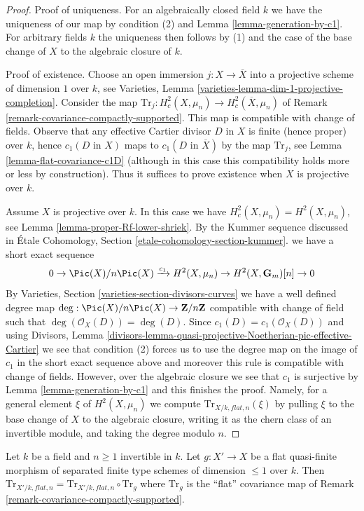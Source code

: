 \begin{proof}
Proof of uniqueness. For an algebraically closed field $k$
we have the uniqueness of our map by condition (2) and
Lemma \ref{lemma-generation-by-c1}. For arbitrary fields $k$
the uniqueness then follows by (1) and the case of the base
change of $X$ to the algebraic closure of $k$.

\medskip\noindent
Proof of existence. Choose an open immersion $j : X \to \overline{X}$
into a projective scheme of dimension $1$ over $k$, see
Varieties, Lemma \ref{varieties-lemma-dim-1-projective-completion}.
Consider the map
$\text{Tr}_j : H^2_c(X, \mu_n) \to H^2_c(\overline{X}, \mu_n)$
of Remark \ref{remark-covariance-compactly-supported}.
This map is compatible with change of fields.
Observe that any effective Cartier divisor $D$ in $X$ is finite
(hence proper) over $k$, hence $c_1(D\text{ in }X)$
maps to $c_1(D\text{ in }\overline{X})$ by the map $\text{Tr}_j$, see
Lemma \ref{lemma-flat-covariance-c1D} (although in this case
this compatibility holds more or less by construction).
Thus it suffices to prove existence when $X$ is projective over $k$.

\medskip\noindent
Assume $X$ is projective over $k$. In this case we have
$H^2_c(X, \mu_n) = H^2(X, \mu_n)$, see
Lemma \ref{lemma-proper-Rf-lower-shriek}.
By the Kummer sequence discussed in
\'Etale Cohomology, Section \ref{etale-cohomology-section-kummer}.
we have a short exact sequence
$$
0 \to
\Pic(X)/n\Pic(X) \xrightarrow{c_1}
H^2(X, \mu_n) \to
H^2(X, \mathbf{G}_m)[n] \to 0
$$
By Varieties, Section \ref{varieties-section-divisors-curves}
we have a well defined degree map
$\deg : \Pic(X)/n\Pic(X) \to \mathbf{Z}/n\mathbf{Z}$
compatible with change of field such that
$\deg(\mathcal{O}_X(D)) = \deg(D)$.
Since $c_1(D) = c_1(\mathcal{O}_X(D))$ and using
Divisors, Lemma
\ref{divisors-lemma-quasi-projective-Noetherian-pic-effective-Cartier}
we see that condition (2) forces us to use the degree map
on the image of $c_1$ in the short exact sequence above
and moreover this rule is compatible with change of fields.
However, over the algebraic closure we see that $c_1$ is surjective by
Lemma \ref{lemma-generation-by-c1} and this finishes the proof.
Namely, for a general element $\xi$ of
$H^2(X, \mu_n)$ we compute $\text{Tr}_{X/k, \mathit{flat}, n}(\xi)$
by pulling $\xi$ to the base change of $X$ to the algebraic closure,
writing it as the chern class of an invertible module, and
taking the degree modulo $n$.
\end{proof}

\begin{lemma}
\label{lemma-flat-covariance-trace-curve}
Let $k$ be a field and $n \geq 1$ invertible in $k$.
Let $g : X' \to X$ be a flat quasi-finite morphism of
separated finite type schemes of dimension $\leq 1$ over $k$.
Then $\text{Tr}_{X'/k, \mathit{flat}, n} =
\text{Tr}_{X'/k, \mathit{flat}, n} \circ \text{Tr}_g$
where $\text{Tr}_g$ is the ``flat'' covariance map
of Remark \ref{remark-covariance-compactly-supported}.
\end{lemma}

